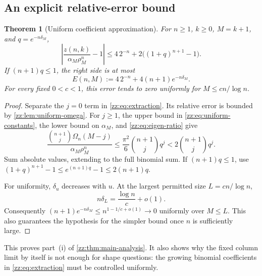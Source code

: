 \documentclass[11pt,a4paper]{article}
\newtheorem{theorem}{Theorem}[section]
\theoremstyle{definition}
\newcommand{\Om}{\Omega}
\begin{document}
\subsection{An explicit relative-error bound}
\begin{theorem}[Uniform coefficient approximation]
\label{zz:thm:uniform-bound}
For $n\ge1$, $k\ge0$, $M=k+1$, and $q=e^{-n\delta_M}$,
\begin{equation}\label{zz:eq:error-exact}
 \left|\frac{z(n,k)}{\alpha_M\rho_M^n}-1\right|
 \le4\,2^{-n}+2\bigl((1+q)^{n+1}-1\bigr).
\end{equation}
If $(n+1)q\le1$, the right side is at most
\begin{equation}\label{zz:eq:error-simple}
 E(n,M):=4\,2^{-n}+4(n+1)e^{-n\delta_M}.
\end{equation}
For every fixed $0<c<1$, this error tends to zero uniformly for
$M\le c n/\log n$.
\end{theorem}
\begin{proof}
Separate the $j=0$ term in \eqref{zz:eq:extraction}.  Its relative error is bounded
by \cref{zz:lem:uniform-omega}.  For $j\ge1$, the upper bound in
\eqref{zz:eq:uniform-constants}, the lower bound on $\alpha_M$, and
\eqref{zz:eq:eigen-ratio} give
\[
 \frac{\binom{n+1}{j}\Om_n(M-j)}{\alpha_M\rho_M^n}
 \le\frac{\pi^2}{6}\binom{n+1}{j}q^j
 <2\binom{n+1}{j}q^j.
\]
Sum absolute values, extending to the full binomial sum.
If $(n+1)q\le1$, use
$(1+q)^{n+1}-1\le e^{(n+1)q}-1\le2(n+1)q$.

For uniformity, $\delta_u$ decreases with $u$.
At the largest permitted size $L=c n/\log n$,
\[
 n\delta_L=\frac{\log n}{c}+o(1).
\]
Consequently $(n+1)e^{-n\delta_M}\le n^{1-1/c+o(1)}\to0$
uniformly over $M\le L$.  This also guarantees the hypothesis for the simpler
bound once $n$ is sufficiently large.
\end{proof}

This proves part~(i) of \cref{zz:thm:main-analysis}.  It also shows why the fixed
column limit by itself is not enough for shape questions: the growing
binomial coefficients in \eqref{zz:eq:extraction} must be controlled uniformly.
\end{document}
